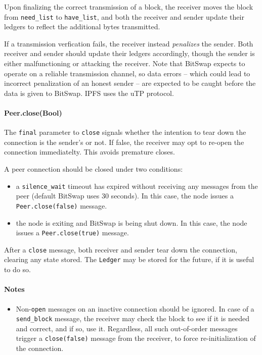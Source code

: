 \documentclass{sig-alternate}
\begin{document}
Upon finalizing the correct transmission of a block, the receiver moves the
block from \texttt{need\_list} to \texttt{have\_list}, and both the receiver
and sender update their ledgers to reflect the additional bytes transmitted.

If a transmission verfication fails, the receiver instead \textit{penalizes}
the sender. Both receiver and sender should update their ledgers accordingly,
though the sender is either malfunctioning or attacking the receiver. Note that
BitSwap expects to operate on a reliable transmission channel, so data errors
-- which could lead to incorrect penalization of an honest sender -- are
expected to be caught before the data is given to BitSwap. IPFS uses the uTP
protocol.

\paragraph{Peer.close(Bool)}

The \texttt{final} parameter to \texttt{close} signals whether the intention
to tear down the connection is the sender's or not. If false, the receiver
may opt to re-open the connection immediatelty. This avoids premature
closes.

A peer connection should be closed under two conditions:
\begin{itemize}
  \item a \texttt{silence\_wait} timeout has expired without receiving any
        messages from the peer (default BitSwap uses 30 seconds).
        In this case, the node issues a \texttt{Peer.close(false)} message.
  \item the node is exiting and BitSwap is being shut down.
        In this case, the node issues a \texttt{Peer.close(true)} message.
\end{itemize}

After a \texttt{close} message, both receiver and sender tear down the
connection, clearing any state stored. The \texttt{Ledger} may be stored for
the future, if it is useful to do so.

\paragraph{Notes}

\begin{itemize}
  \item Non-\texttt{open} messages on an inactive connection should be ignored.
        In case of a \texttt{send\_block} message, the receiver may check
        the block to see if it is needed and correct, and if so, use it.
        Regardless, all such out-of-order messages trigger a
        \texttt{close(false)} message from the receiver, to force
        re-initialization of the connection.
\end{itemize}
\end{document}
